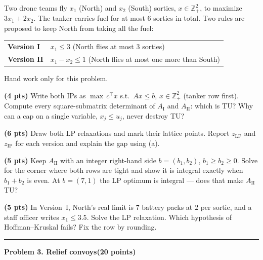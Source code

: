 \documentclass[10pt]{article}
\newcommand{\problem}[2]{%
  \par\bigskip
  {\color{ruleink}\rule{\textwidth}{1pt}}\par\nobreak\vspace{3pt}
  {\large\bfseries #2}\hfill{\normalsize\bfseries(#1 points)}\par\nobreak\vspace{4pt}}
\begin{document}
Two drone teams fly $x_1$ (North) and $x_2$ (South) sorties, $x \in \mathbb{Z}^2_{+}$,
to maximize $3x_1 + 2x_2$. The tanker carries fuel for at most $6$ sorties in total.
Two rules are proposed to keep North from taking all the fuel:
\begin{center}
\begin{tabular}{l@{\qquad}l}
 \textbf{Version I}  & $x_1 \le 3$ \quad (North flies at most $3$ sorties) \\[2pt]
 \textbf{Version II} & $x_1 - x_2 \le 1$ \quad (North flies at most one more than South)
\end{tabular}
\end{center}
Hand work only for this problem.

\begin{parts}
\item \textbf{(4 pts)} Write both IPs as $\max\, c^{\top}x$ s.t.\ $Ax \le b$,
  $x \in \mathbb{Z}^2_{+}$ (tanker row first). Compute every square-submatrix
  determinant of $A_{\mathrm{I}}$ and $A_{\mathrm{II}}$: which is TU? Why can a cap on a
  single variable, $x_j \le u_j$, never destroy TU?
\item \textbf{(6 pts)} Draw both LP relaxations and mark their lattice points. Report
  $z_{\mathrm{LP}}$ and $z_{\mathrm{IP}}$ for each version and explain the gap using (a).
\item \textbf{(5 pts)} Keep $A_{\mathrm{II}}$ with an integer right-hand side
  $b = (b_1, b_2)$, $b_1 \ge b_2 \ge 0$. Solve for the corner where both rows are tight
  and show it is integral exactly when $b_1 + b_2$ is even. At $b = (7,1)$ the LP
  optimum is integral --- does that make $A_{\mathrm{II}}$ TU?
\item \textbf{(5 pts)} In Version~I, North's real limit is $7$ battery packs at $2$ per
  sortie, and a staff officer writes $x_1 \le 3.5$. Solve the LP relaxation. Which
  hypothesis of Hoffman--Kruskal fails? Fix the row by rounding.
\end{parts}

\problem{20}{Problem 3. Relief convoys}
\end{document}
